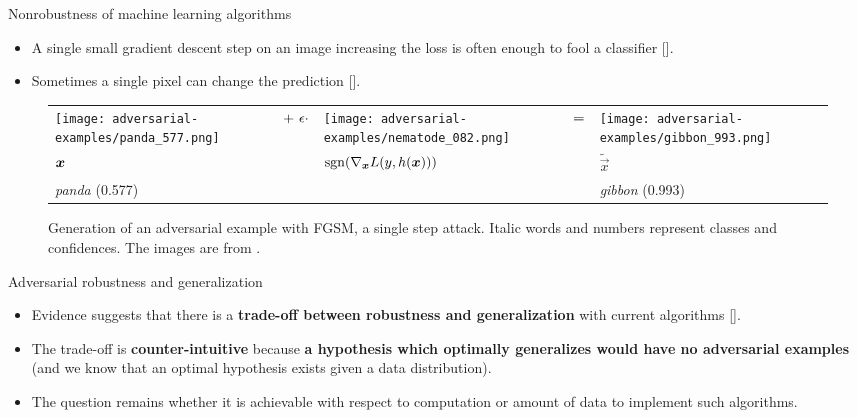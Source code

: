 \documentclass{beamer}
\newcommand{\citet}[1]{{\color{citecolor}\relscale{0.8}\textcite{#1}}}
\newcommand{\citep}[1]{{\color{citecolor}\relscale{0.8}[\textcite{#1}]}}
\begin{document}
\begin{frame}[allowframebreaks=0.9]{Nonrobustness of machine learning algorithms}
	\begin{itemize}
		\item A single small gradient descent step on an image increasing the loss is often enough to fool a classifier \citep{Goodfellow:2014:EHAE}.
		\item Sometimes a single pixel can change the prediction \citep{Su:2017:OPAFDNN}.
	\end{itemize}
	\begin{figure}
	\centering
	{\scriptsize
		\begin{tabular}{>{\centering\arraybackslash}m{}m{.1in}>{\centering\arraybackslash}m{}m{.05in}>{\centering\arraybackslash}m{}}
			\centering\arraybackslash
			\texttt{[image: adversarial-examples/panda\_577.png]} &%
			\centering\arraybackslash%
			$\centering +\ \epsilon \cdot$ &%
			\texttt{[image: adversarial-examples/nematode\_082.png]} &%
			$\centering =$ & %
			\texttt{[image: adversarial-examples/gibbon\_993.png]} \\
			$\centering \vec x$     &%
			& $\sgn\del{\nabla_{\vec x} L(y,h(\vec x))}$ & & $\tilde{\vec x}$ \\
			\emph{panda} (0.577) & & & & \emph{gibbon} (0.993) 
		\end{tabular}
	}
	\caption{Generation of an adversarial example with FGSM, a single step attack. Italic words and numbers represent classes and confidences. The images are from \citet{Goodfellow:2014:EHAE}.}
	\label{fig:fgsm-adversarial-example}
	\end{figure}
\end{frame}

\begin{frame}{Adversarial robustness and generalization}
	\begin{itemize}
		\item Evidence suggests that there is a \textbf{trade-off between robustness and generalization} with current algorithms \citep{Tsipras:2018:RMBOA,Madry:2017:TDLMRAA,Su:2018:IRTCOACSRDICM}.
		\item The trade-off is \textbf{counter-intuitive} because \textbf{a hypothesis which optimally generalizes would have no adversarial examples} (and we know that an optimal hypothesis exists given a data distribution).
		\item The question remains whether it is achievable with respect to computation or amount of data to implement such algorithms.
	\end{itemize}
\end{frame}
\end{document}
